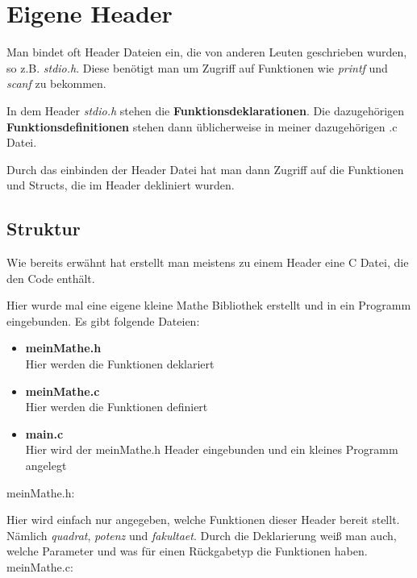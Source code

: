 \documentclass[c_worksheet.tex]{subfiles}
\begin{document}
\chapter{Eigene Header}

Man bindet oft Header Dateien ein, die von anderen Leuten geschrieben wurden, so z.B. \emph{stdio.h}. Diese benötigt man um Zugriff auf Funktionen wie \emph{printf} und \emph{scanf} zu bekommen.

In dem Header \emph{stdio.h} stehen die \textbf{Funktionsdeklarationen}. Die dazugehörigen \textbf{Funktionsdefinitionen} stehen dann üblicherweise in meiner dazugehörigen .c Datei.

Durch das einbinden der Header Datei hat man dann Zugriff auf die Funktionen und Structs, die im Header dekliniert wurden.


\section{Struktur}

Wie bereits erwähnt hat erstellt man meistens zu einem Header eine C Datei, die den Code enthält.

Hier wurde mal eine eigene kleine Mathe Bibliothek erstellt und in ein Programm eingebunden. Es gibt folgende Dateien:

\begin{itemize}
 	\item \textbf{meinMathe.h} \\
 	Hier werden die Funktionen deklariert
 	\item \textbf{meinMathe.c} \\
 	Hier werden die Funktionen definiert
 	\item \textbf{main.c} \\
 	Hier wird der meinMathe.h Header eingebunden und ein kleines Programm angelegt
 \end{itemize} 

 meinMathe.h:

  

Hier wird einfach nur angegeben, welche Funktionen dieser Header bereit stellt. Nämlich \emph{quadrat}, \emph{potenz} und \emph{fakultaet}. Durch die Deklarierung weiß man auch, welche Parameter und was für einen Rückgabetyp die Funktionen haben.\\

meinMathe.c:


\end{document}
